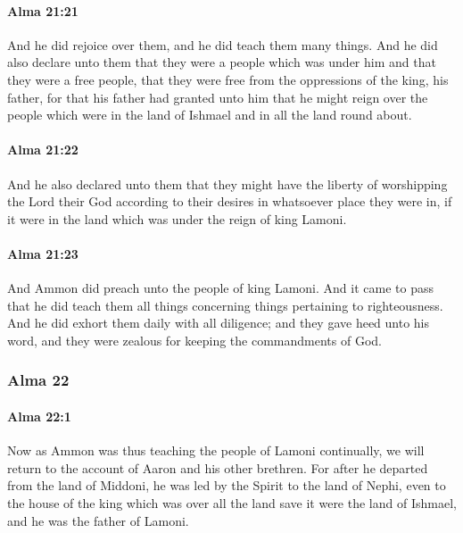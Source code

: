 		\paragraph{Alma 21:21} %
			\label{ALMA-21-21}

			And he did rejoice over them,
			and he did teach them many things.
			And he did also declare unto them
			that they were a people which was under him
			and that they were a free people,
			that they were free from the oppressions of the king, his father,
			for that his father had granted unto him that he might reign over the people
			which were in the land of Ishmael and in all the land round about.

		\paragraph{Alma 21:22} %
			\label{ALMA-21-22}

			And he also declared unto them
			that they might have the liberty of worshipping the Lord their God
			according to their desires in whatsoever place they were in,
			if it were in the land which was under the reign of king Lamoni.

		\paragraph{Alma 21:23} %
			\label{ALMA-21-23}

			And Ammon did preach unto the people of king Lamoni.
			And it came to pass that he did teach them all things
			concerning things pertaining to righteousness.
			And he did exhort them daily with all diligence;
			and they gave heed unto his word,
			and they were zealous for keeping the commandments of God.

	\subsubsection{Alma 22} %
		\label{ALMA-22}
		
		\paragraph{Alma 22:1} %
			\label{ALMA-22-1}

			Now as Ammon was thus teaching the people of Lamoni continually,
			we will return to the account of Aaron and his other brethren.
			For after he departed from the land of Middoni,
			he was led by the Spirit to the land of Nephi,
			even to the house of the king which was over all the land
			save it were the land of Ishmael,
			and he was the father of Lamoni.

